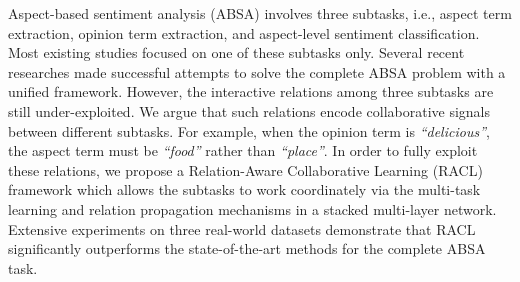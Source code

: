 Aspect-based sentiment analysis (ABSA) involves three subtasks, i.e., aspect term extraction, opinion term extraction, and aspect-level sentiment classification. Most existing studies focused on one of these subtasks only. Several recent researches made successful attempts to solve the complete ABSA problem with a unified framework. However, the interactive relations among three subtasks are still under-exploited. We argue that such relations encode collaborative signals between different subtasks. For example, when the opinion term is \emph{``delicious''}, the aspect term must be \emph{``food''}  rather than \emph{``place''}. In order to fully exploit these relations, we propose a Relation-Aware Collaborative Learning (RACL) framework which allows the subtasks to work coordinately via the multi-task learning and relation propagation mechanisms in a stacked multi-layer network. Extensive experiments on three real-world datasets demonstrate that RACL significantly outperforms the state-of-the-art methods for the complete ABSA task.
